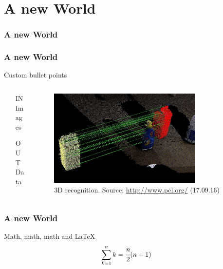 \documentclass{beamer}
\begin{document}
\section{A new World}
\begin{frame}
\frametitle{A new World}
\end{frame}

\begin{frame}
\frametitle{A new World}
Custom bullet points
\begin{columns}
    \begin{column}{0.65\textwidth}
      \begin{itemize}
        \item [IN] Images
        \item [OUT] Data
      \end{itemize}
    \end{column}

    \begin{column}{0.35\textwidth}
      \begin{figure}[ht]
        \centering
        \includegraphics[width=0.8\textwidth]{img/pcl.jpg}
        \caption{3D recognition. \tiny{Source: \url{http://www.pcl.org/} (17.09.16)} }
      \end{figure}
    \end{column}
  \end{columns}
\end{frame}

\begin{frame}
    \frametitle{A new World}
    Math, math, math and \LaTeX
    \begin{equation}
      \sum_{k=1}^{n}{k} = \cfrac{n}{2}(n+1)
    \end{equation}
\end{frame}
\end{document}
